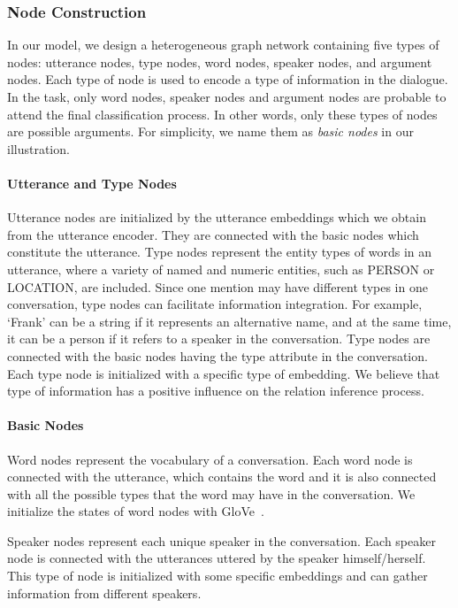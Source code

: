 \documentclass[11pt]{article}
\begin{document}
\subsubsection{Node Construction}
In our model, we design a heterogeneous graph network containing five types of nodes: utterance nodes, type
nodes, word nodes, speaker nodes, and argument nodes.
Each type of node is used to encode a type of information in the dialogue.
In the task, only word nodes, speaker nodes and argument nodes are probable to attend the final classification process. In other words, only these types of nodes are possible arguments.
For simplicity, we name them as \textit{basic nodes} in our illustration.

\paragraph{Utterance and Type Nodes}
Utterance nodes are initialized by the utterance embeddings which we obtain from the utterance encoder.
They are connected with the basic nodes which constitute the utterance.
Type nodes represent the entity types of words in an utterance, where a variety of named and numeric entities, such as PERSON or LOCATION, are included.
Since one mention may have different types in one conversation, type nodes can facilitate information integration. For example, `Frank' can be a string if it represents an alternative name, and at the same time, it can be a person if it refers to a speaker in the conversation. Type nodes are connected with the basic nodes having the type attribute in the conversation. Each type node is initialized with a specific type of embedding. We believe that type of information has a positive influence on the relation inference process.


\paragraph{Basic Nodes}
Word nodes represent the vocabulary of a conversation. Each word node is connected with the utterance, which contains the word and it is also connected with all the possible types that the word may have in the conversation. We initialize the states of word nodes with GloVe~\cite{pennington2014glove}.

Speaker nodes represent each unique speaker in the conversation. Each speaker node is connected with the utterances uttered by the speaker himself/herself. This type of node is initialized with some specific embeddings and can gather information from different speakers.
\end{document}
